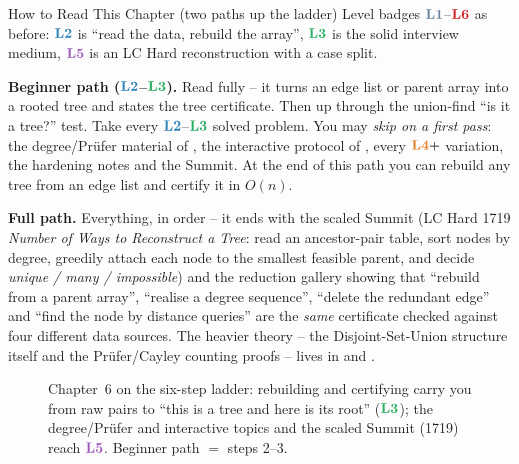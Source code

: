 \begin{chaptertheorybox}{How to Read This Chapter (two paths up the ladder)}
Level badges $\lv1$--$\lv6$ as before: $\lv2$ is ``read the data, rebuild the array'', $\lv3$ is
the solid interview medium, $\lv5$ is an LC Hard reconstruction with a case split.

\textbf{Beginner path ($\lv2$--$\lv3$).} Read  fully -- it turns an edge list
or parent array into a rooted tree and states the tree certificate. Then 
up through the union-find ``is it a tree?'' test. Take every $\lv2$--$\lv3$ solved problem. You
may \emph{skip on a first pass}: the degree/Pr\"ufer material of , the
interactive protocol of , every $\lv4{+}$ variation, the hardening notes and
the Summit. At the end of this path you can rebuild any tree from an edge list and certify it in
$O(n)$.

\textbf{Full path.} Everything, in order -- it ends with the scaled Summit (LC Hard 1719
\emph{Number of Ways to Reconstruct a Tree}: read an ancestor-pair table, sort nodes by degree,
greedily attach each node to the smallest feasible parent, and decide \emph{unique / many /
impossible}) and the reduction gallery showing that ``rebuild from a parent array'', ``realise a
degree sequence'', ``delete the redundant edge'' and ``find the node by distance queries'' are the
\emph{same} certificate checked against four different data sources. The heavier theory -- the
Disjoint-Set-Union structure itself and the Pr\"ufer/Cayley counting proofs -- lives in
 and .
\end{chaptertheorybox}

\begin{figure}[H]
\centering
{}
\caption*{Chapter~6 on the six-step ladder: rebuilding and certifying carry you from raw pairs to
``this is a tree and here is its root'' ($\lv3$); the degree/Pr\"ufer and interactive topics and the
scaled Summit (1719) reach $\lv5$. Beginner path $=$ steps 2--3.}
\end{figure}

